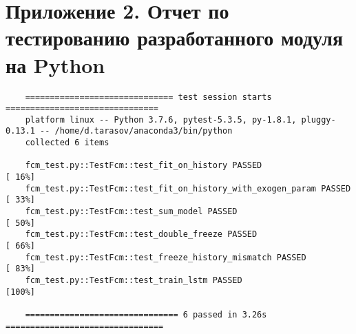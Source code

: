 ﻿\chapter{Приложение 2. Отчет по тестированию разработанного модуля на Python}
\label{listing:test_report}

\begin{lstlisting}
    ============================== test session starts ===============================
    platform linux -- Python 3.7.6, pytest-5.3.5, py-1.8.1, pluggy-0.13.1 -- /home/d.tarasov/anaconda3/bin/python
    collected 6 items
    
    fcm_test.py::TestFcm::test_fit_on_history PASSED                           [ 16%]
    fcm_test.py::TestFcm::test_fit_on_history_with_exogen_param PASSED         [ 33%]
    fcm_test.py::TestFcm::test_sum_model PASSED                                [ 50%]
    fcm_test.py::TestFcm::test_double_freeze PASSED                            [ 66%]
    fcm_test.py::TestFcm::test_freeze_history_mismatch PASSED                  [ 83%]
    fcm_test.py::TestFcm::test_train_lstm PASSED                               [100%]
    
    =============================== 6 passed in 3.26s ================================
\end{lstlisting}




